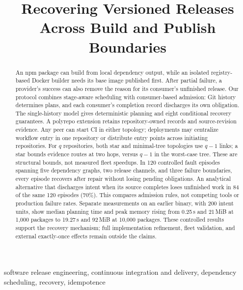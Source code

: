 \documentclass[10pt,conference]{IEEEtran}
\theoremstyle{definition}
\begin{document}
\title{Recovering Versioned Releases Across Build and Publish Boundaries}
\maketitle
\begin{abstract}
An npm package can build from local dependency output, while an isolated
registry-based Docker builder needs its base image published first. After
partial failure, a provider's success can also remove the reason for its
consumer's unfinished release. Our protocol combines stage-aware scheduling
with consumer-based admission: Git history determines plans, and each
consumer's completion record discharges its own obligation. The single-history
model gives deterministic planning and eight conditional recovery guarantees.
A polyrepo extension retains repository-owned records and source-revision
evidence. Any peer can start CI in either topology; deployments may centralize
workflow entry in one repository or distribute entry points across initiating
repositories. For $q$ repositories, both star and minimal-tree topologies use
$q-1$ links; a star bounds evidence routes at two hops, versus $q-1$ in the
worst-case tree. These are structural bounds, not measured fleet speedups.
In 120 controlled fault episodes spanning five dependency graphs, two release
channels, and three failure boundaries, every episode recovers after repair
without losing pending obligations. An analytical alternative that discharges
intent when its source completes loses unfinished work in 84 of the same 120
episodes (70\%). This compares admission rules, not competing tools or
production failure rates. Separate measurements on
an earlier binary, with 200 intent units, show median planning time and peak
memory rising from 0.25\,s and 21\,MiB at 1,000 packages to 19.27\,s and
92\,MiB at 10,000 packages. These controlled results support the recovery
mechanism; full implementation refinement, fleet validation, and external
exactly-once effects remain outside the claims.
\end{abstract}
\begin{IEEEkeywords}
software release engineering, continuous integration and delivery,
dependency scheduling, recovery, idempotence
\end{IEEEkeywords}






\clearpage
{}

\end{document}

